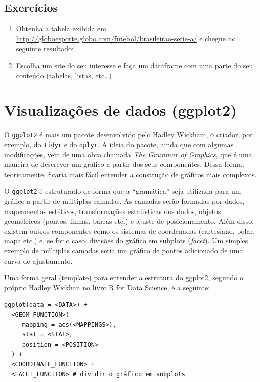 \documentclass[]{book}
\begin{document}
\section{Exercícios}\label{exercicios-7}

\begin{enumerate}
\def\labelenumi{\arabic{enumi}.}
\item
  Obtenha a tabela exibida em
  \url{http://globoesporte.globo.com/futebol/brasileirao-serie-a/} e
  chegue no seguinte resultado:
\item
  Escolha um site do seu interesse e faça um dataframe com uma parte do
  seu conteúdo (tabelas, listas, etc\ldots{})
\end{enumerate}

\chapter{Visualizações de dados (ggplot2)}\label{ggplot2}

O \texttt{ggplot2} é mais um pacote desenvolvido pelo Hadley Wickham, o
criador, por exemplo, do \texttt{tidyr} e do \texttt{dplyr}. A ideia do
pacote, ainda que com algumas modificações, vem de uma obra chamada
\href{https://www.amazon.com/Grammar-Graphics-Statistics-Computing/dp/0387245448}{\emph{The
Grammar of Graphics}}, que é uma maneira de descrever um gráfico a
partir dos seus componentes. Dessa forma, teoricamente, ficaria mais
fácil entender a construção de gráficos mais complexos.

O \texttt{ggplot2} é estruturado de forma que a ``gramática'' seja
utilizada para um gráfico a partir de múltiplas camadas. As camadas
serão formadas por dados, mapeamentos estéticos, transformações
estatísticas dos dados, objetos geométricos (pontos, linhas, barras
etc.) e ajuste de posicionamento. Além disso, existem outros componentes
como os sistemas de coordenadas (cartesiano, polar, mapa etc.) e, se for
o caso, divisões do gráfico em subplots (\emph{facet}). Um simples
exemplo de múltiplas camadas seria um gráfico de pontos adicionado de
uma curva de ajustamento.

Uma forma geral (template) para entender a estrutura do ggplot2, segundo
o próprio Hadley Wickhan no livro
\href{http://r4ds.had.co.nz/data-visualisation.html\#the-layered-grammar-of-graphics}{R
for Data Science}, é a seguinte:

\begin{verbatim}
ggplot(data = <DATA>) + 
  <GEOM_FUNCTION>(
     mapping = aes(<MAPPINGS>),
     stat = <STAT>, 
     position = <POSITION>
  ) +
  <COORDINATE_FUNCTION> +
  <FACET_FUNCTION> # dividir o gráfico em subplots
\end{verbatim}
\end{document}
